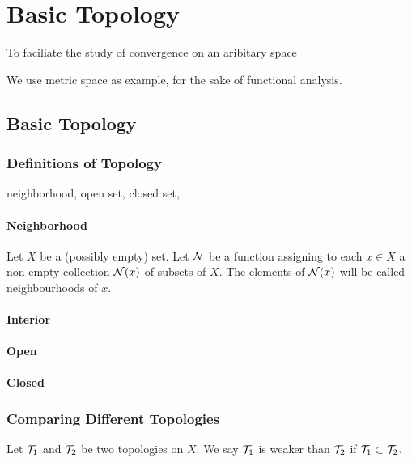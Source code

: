 \chapter{Basic Topology}




To faciliate the study of convergence on an aribitary space

We use metric space as example, for the sake of functional analysis.

\section{Basic Topology}

\subsection{Definitions of Topology}
neighborhood, open set, closed set, 

\subsubsection{Neighborhood}
Let $X$ be a (possibly empty) set. 
Let $\mathcal{N}$ be a function assigning to each $x\in X$ a non-empty collection $\mathcal{N}(x)$ of subsets of $X$.
The elements of $\mathcal{N}(x)$ will be called neighbourhoods of $x$.

\subsubsection{Interior}


\subsubsection{Open}



\subsubsection{Closed}


\subsection{Comparing Different Topologies}

\begin{definition}
    Let $\mathcal{T}_1$ and $\mathcal{T}_2$ be two topologies on $X$. We say $\mathcal{T}_1$ is weaker than $\mathcal{T}_2$ if $\mathcal{T}_1\subset \mathcal{T}_2$.
\end{definition}

